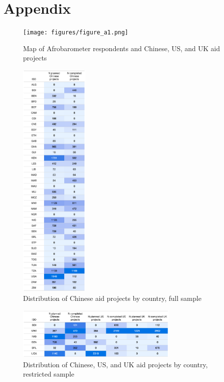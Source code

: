 \documentclass[9pt]{article}
\begin{document}
\renewcommand\thefigure{A\arabic{figure}}    
\renewcommand\thetable{A\arabic{table}}    

\setcounter{figure}{0} 
\setcounter{table}{0} 

\newpage
\appendix
\section{Appendix}

\begin{figure}[H]
\centering
\caption{Map of Afrobarometer respondents and Chinese, US, and UK aid projects}
\texttt{[image: figures/figure\_a1.png]}
\end{figure}

\begin{figure}[H]
\centering
\caption{Distribution of Chinese aid projects by country, full sample}
\includegraphics[width=0.3\textwidth]{figures/figure_a2.png}
\end{figure}

\begin{figure}[H]
\centering
\caption{Distribution of Chinese, US, and UK aid projects by country, restricted sample}
\includegraphics[width=0.7\textwidth]{figures/figure_a3.png}
\end{figure}
\end{document}
